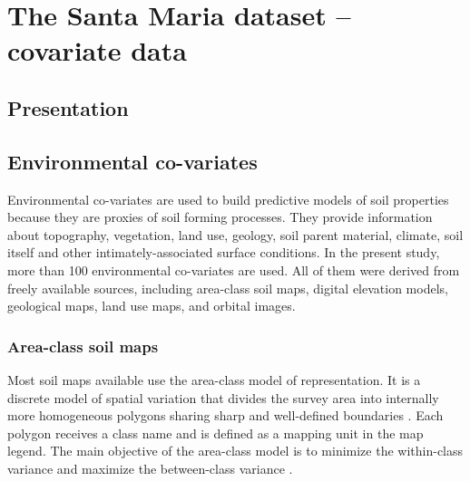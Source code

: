 \artigofalse
\chapter{The Santa Maria dataset -- covariate data}
\label{apen:database-covariate-data}

\tocless\section{Presentation}

\tocless\section{Environmental co-variates}

Environmental co-variates are used to build predictive models of soil properties because they are proxies of soil forming processes. They provide information about topography, vegetation, land use, geology, soil parent material, climate, soil itself and other intimately-associated surface conditions. In the present study, more than 100 environmental co-variates are used. All of them were derived from freely available sources, including area-class soil maps, digital elevation models, geological maps, land use maps, and orbital images.

\tocless\subsection{Area-class soil maps}

Most soil maps available use the area-class model of representation. It is a discrete model of spatial variation that divides the survey area into internally more homogeneous polygons sharing sharp and well-defined boundaries \cite{Rossiter2000}. Each polygon receives a class name and is defined as a mapping unit in the map legend. The main objective of the area-class model is to minimize the within-class variance and maximize the between-class variance \cite{WebsterEtAl1990}.

